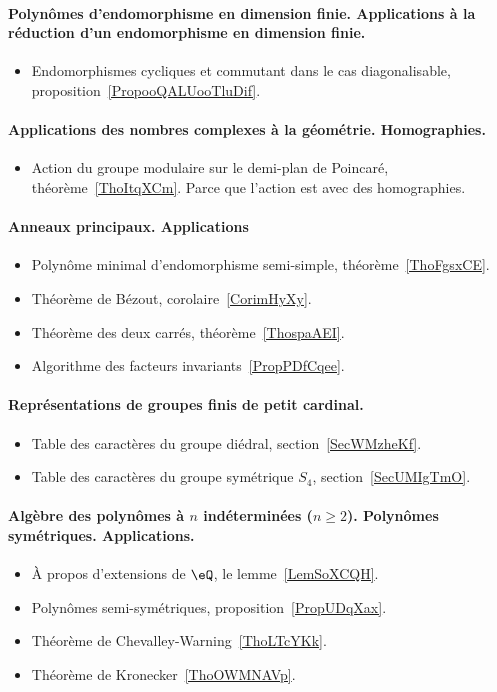 \paragraph{Polynômes d'endomorphisme en dimension finie. Applications à la réduction d'un endomorphisme en dimension finie.}
\begin{itemize}
    \item Endomorphismes cycliques et commutant dans le cas diagonalisable, proposition~\ref{PropooQALUooTluDif}.
\end{itemize}
\paragraph{Applications des nombres complexes à la géométrie. Homographies.}
\begin{itemize}
    \item Action du groupe modulaire sur le demi-plan de Poincaré, théorème~\ref{ThoItqXCm}. Parce que l'action est avec des homographies.
\end{itemize}

\paragraph{Anneaux principaux. Applications}
\begin{itemize}
    \item Polynôme minimal d'endomorphisme semi-simple, théorème~\ref{ThoFgsxCE}.
    \item Théorème de Bézout, corolaire~\ref{CorimHyXy}.
    \item Théorème des deux carrés, théorème~\ref{ThospaAEI}.
    \item Algorithme des facteurs invariants~\ref{PropPDfCqee}.
\end{itemize}
\paragraph{Représentations de groupes finis de petit cardinal.}
\begin{itemize}
    \item Table des caractères du groupe diédral, section~\ref{SecWMzheKf}.
    \item Table des caractères du groupe symétrique \( S_4\), section~\ref{SecUMIgTmO}.
\end{itemize}
\paragraph{Algèbre des polynômes à \( n\) indéterminées (\( n\geq 2\)). Polynômes symétriques. Applications.}
\begin{itemize}
    \item À propos d'extensions de \( \eQ\), le lemme~\ref{LemSoXCQH}.
    \item Polynômes semi-symétriques, proposition~\ref{PropUDqXax}.
    \item Théorème de Chevalley-Warning~\ref{ThoLTcYKk}.
    \item Théorème de Kronecker~\ref{ThoOWMNAVp}.
\end{itemize}

